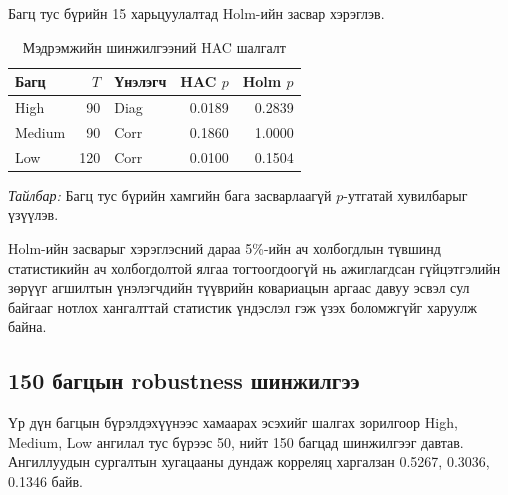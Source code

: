 Багц тус бүрийн 15 харьцуулалтад
Holm-ийн засвар хэрэглэв.

\begin{table}[htbp]
	\centering
	\caption{Мэдрэмжийн шинжилгээний HAC шалгалт}
	\label{tab:nt_hac_summary}
	\small
	\begin{tabular}{lrlrr}
		\hline
		Багц & $T$ & Үнэлэгч & HAC $p$ & Holm $p$\\
		\hline
		High   & 90  & Diag & 0.0189 & 0.2839\\
		Medium & 90  & Corr & 0.1860 & 1.0000\\
		Low    & 120 & Corr & 0.0100 & 0.1504\\
		\hline
	\end{tabular}
\end{table}

\noindent
\textit{Тайлбар:} Багц тус бүрийн хамгийн
бага засварлаагүй $p$-утгатай хувилбарыг
үзүүлэв.

Holm-ийн засварыг хэрэглэсний дараа 5\%-ийн ач холбогдлын түвшинд статистикийн ач холбогдолтой ялгаа тогтоогдоогүй нь ажиглагдсан гүйцэтгэлийн зөрүүг агшилтын үнэлэгчдийн түүврийн ковариацын аргаас давуу эсвэл сул байгааг нотлох хангалттай статистик үндэслэл гэж үзэх боломжгүйг харуулж байна.

\subsection{150 багцын robustness шинжилгээ}
\label{subsec:robustness_results}

Үр дүн багцын бүрэлдэхүүнээс хамаарах
эсэхийг шалгах зорилгоор High, Medium,
Low ангилал тус бүрээс 50, нийт 150
багцад шинжилгээг давтав. Ангиллуудын
сургалтын хугацааны дундаж корреляц
харгалзан 0.5267, 0.3036, 0.1346 байв.

